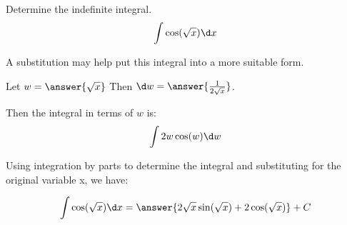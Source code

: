 \documentclass{ximera}
\author{Jason Miller}
\begin{document}
\begin{exercise}
Determine the indefinite integral. 
\[
\int \cos(\sqrt{x}) \d x
\]


A substitution may help put this integral into a more suitable form. 

Let $w=\answer{\sqrt{x}}$ Then $\d w=\answer{\frac{1}{2\sqrt{x}}}$. 

Then the integral in terms of $w$ is:
\[
\int {2w\cos(w)} \d w
\]

Using integration by parts to determine the integral and substituting for the original variable x, we have:

\[
\int \cos(\sqrt{x}) \d x =\answer{ 2\sqrt{x}\sin(\sqrt{x})+2\cos(\sqrt{x})}  + C
\]


\end{exercise}
\end{document}
